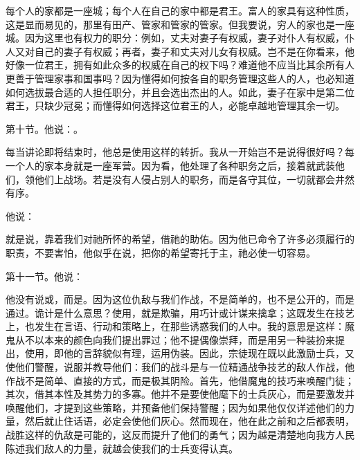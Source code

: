 每个人的家都是一座城；每个人在自己的家中都是君王。富人的家具有这种性质，这是显而易见的，那里有田产、管家和管家的管家。但我要说，穷人的家也是一座城。因为这里也有权力的职分：例如，丈夫对妻子有权威，妻子对仆人有权威，仆人又对自己的妻子有权威；再者，妻子和丈夫对儿女有权威。岂不是在你看来，他好像一位君王，拥有如此众多的权威在自己的权下吗？难道他不应当比其余所有人更善于管理家事和国事吗？因为懂得如何按各自的职务管理这些人的人，也必知道如何选拔最合适的人担任职分，并且会选出杰出的人。如此，妻子在家中是第二位君王，只缺少冠冕；而懂得如何选择这位君王的人，必能卓越地管理其余一切。\par

第十节。他说：。\par

每当讲论即将结束时，他总是使用这样的转折。我从一开始岂不是说得很好吗？每一个人的家本身就是一座军营。因为看，他处理了各种职务之后，接着就武装他们，领他们上战场。若是没有人侵占别人的职务，而是各守其位，一切就都会井然有序。\par

他说：\par

就是说，靠着我们对祂所怀的希望，借祂的助佑。因为他已命令了许多必须履行的职责，不要害怕，他似乎在说，把你的希望寄托于主，祂必使一切容易。\par

第十一节。他说：\par

他没有说或，而是。因为这位仇敌与我们作战，不是简单的，也不是公开的，而是通过。诡计是什么意思？使用，就是欺骗，用巧计或计谋来擒拿；这既发生在技艺上，也发生在言语、行动和策略上，在那些诱惑我们的人中。我的意思是这样：魔鬼从不以本来的颜色向我们提出罪过；他不提偶像崇拜，而是用另一种装扮来提出，使用，即他的言辞貌似有理，运用伪装。因此，宗徒现在既以此激励士兵，又使他们警醒，说服并教导他们：我们的战斗是与一位精通战争技艺的敌人作战，他作战不是简单、直接的方式，而是极其阴险。首先，他借魔鬼的技巧来唤醒门徒；其次，借其本性及其势力的多寡。他并不是要使他麾下的士兵灰心，而是要激发并唤醒他们，才提到这些策略，并预备他们保持警醒；因为如果他仅仅详述他们的力量，然后就止住话语，必定会使他们灰心。然而现在，他在此之前和之后都表明，战胜这样的仇敌是可能的，这反而提升了他们的勇气；因为越是清楚地向我方人民陈述我们敌人的力量，就越会使我们的士兵变得认真。\par

